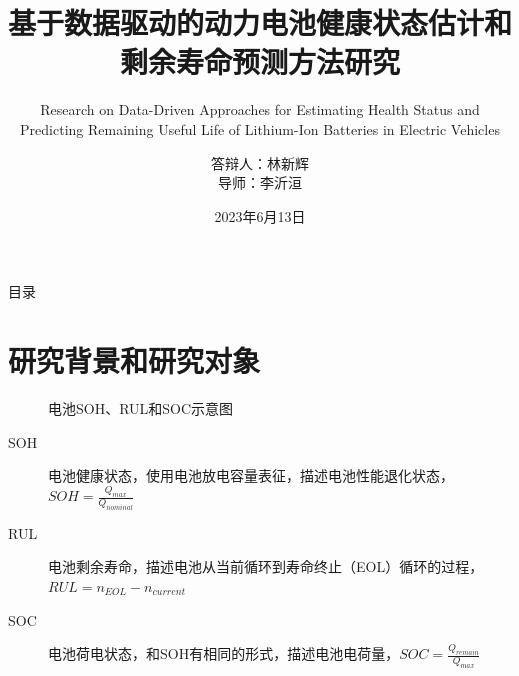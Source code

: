 \documentclass{beamer}
\author[林新辉]{答辩人：林新辉 \\ [5mm] 导师：李沂洹}
\title{基于数据驱动的动力电池健康状态估计和剩余寿命预测方法研究}
\subtitle{Research on Data-Driven Approaches for Estimating Health Status and Predicting Remaining Useful Life of Lithium-Ion Batteries in Electric Vehicles}
\institute{控制与计算机工程学院，华北电力大学}
\date{2023年6月13日}
\begin{document}
\kaishu
\begin{frame}
\titlepage
\end{frame}

\begin{frame}{\small 目录}
\tableofcontents[sectionstyle=show,subsectionstyle=show/shaded/hide,subsubsectionstyle=show/shaded/hide]
\end{frame}

\section{研究背景和研究对象}

\begin{frame}
	\begin{figure}[htbp]
		  \centering
		\captionsetup{font=tiny}
		\caption{电池SOH、RUL和SOC示意图}
		\end{figure}
	\begin{description}
		\item[SOH]
		电池健康状态，使用电池放电容量表征，描述电池性能退化状态，$SOH = \frac{Q_{max}}{Q_{nominal}}$
		\item[RUL]
		电池剩余寿命，描述电池从当前循环到寿命终止（EOL）循环的过程，$RUL = n_{EOL} - n_{current}$
		\item[SOC]
		电池荷电状态，和SOH有相同的形式，描述电池电荷量，$SOC = \frac{Q_{remain}}{Q_{max}}$
	\end{description}
\end{frame}
\end{document}

